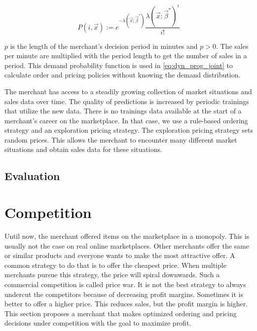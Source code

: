 \begin{equation}
\label{eq:probability}
P(i, \vec{x}) :=
	e^{-\lambda(\vec{x}; \vec{\beta}^*)}
	\frac{\lambda(\vec{x}; \vec{\beta}^*)^{i}}{i!}
\end{equation}

$p$ is the length of the merchant's decision period in minutes and $p > 0$.
The sales per minute are multiplied with the period length to get the number of sales in a period.
This demand probability function is used in \cref{eq:dyn_prog_joint} to calculate order and pricing policies without knowing the demand distribution.

The merchant has access to a steadily growing collection of market situations and sales data over time.
The quality of predictions is increased by periodic trainings that utilize the new data.
There is no trainings data available at the start of a merchant's career on the marketplace.
In that case, we use a rule-based ordering strategy and an exploration pricing strategy.
The exploration pricing strategy sets random prices.
This allows the merchant to encounter many different market situations and obtain sales data for these situations.

\subsection{Evaluation}




\section{Competition}
Until now, the merchant offered items on the marketplace in a monopoly.
This is usually not the case on real online marketplaces.
Other merchants offer the same or similar products and everyone wants to make the most attractive offer.
A common strategy to do that is to offer the cheapest price.
When multiple merchants pursue this strategy, the price will spiral downwards.
Such a commercial competition is called price war.
It is not the best strategy to always undercut the competitors because of decreasing profit margins.
Sometimes it is better to offer a higher price.
This reduces sales, but the profit margin is higher.
This section proposes a merchant that makes optimized ordering and pricing decisions under competition with the goal to maximize profit.

